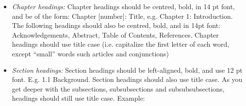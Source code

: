 \begin{itemize}
    Given this it doesn't mean your capstone should be one big \textbf{.tex} file. This template has sectioned the document into folders. Key to this project is the \textbf{chapters} folder, each chapter is named as \emph{chapter 1, chapter 2, etc...}. You can edit the \textbf{.tex} file under the sub-folders. Also, you can create sub-folders or \emph{.tex} files as you deem fit.\\

    \textbf{Example}: In the \emph{chapter 2} folder, you can create the .tex file, \emph{asv.tex}. Since \emph{asv.tex} is a section for chapter two of this capstone, you will go to the tex file for the chapter, i.e \emph{two.tex} and include it like this:
    \begin{quote}
        \verb|\section{Automatic Speaker Verification Systems}|\\
        \verb||
    \end{quote}

    The approach is similar for subsections and subsubsections, if you want you working text to be more modular.

    \begin{quote}
        \verb|\subsection{Deepfake Encoder-Decoder Approach}|\\
        \verb||
    \end{quote}


    \item \emph{Chapter headings: }Chapter headings should be centred, bold, in 14 pt font, and be of the form: Chapter [number]: Title, e.g. Chapter 1: Introduction. The following headings should also be centred, bold, and in 14pt font: Acknowledgements, Abstract, Table of Contents, References.  Chapter headings should use title case (i.e. capitalize the first letter of each word, except “small” words such articles and conjunctions)

    \item \emph{Section headings:} Section headings should be left-aligned, bold, and use 12 pt font.  E.g. 1.1 Background.  Section headings should also use title case. As you get deeper with the subsections, subsubsections and subsubsubsections, headings should still use title case. Example:


\end{itemize}
